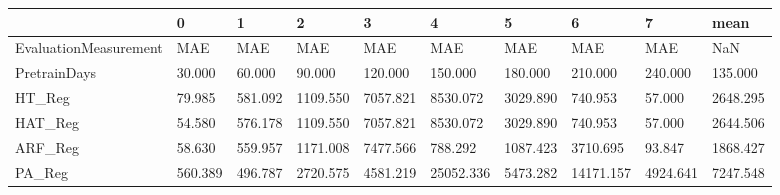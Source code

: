 \begin{tabular}{llllllllll}
\toprule
{} &       0 &       1 &        2 &        3 &         4 &        5 &         6 &        7 &     mean \\
\midrule
EvaluationMeasurement &     MAE &     MAE &      MAE &      MAE &       MAE &      MAE &       MAE &      MAE &      NaN \\
PretrainDays          &  30.000 &  60.000 &   90.000 &  120.000 &   150.000 &  180.000 &   210.000 &  240.000 &  135.000 \\
HT\_Reg                &  79.985 & 581.092 & 1109.550 & 7057.821 &  8530.072 & 3029.890 &   740.953 &   57.000 & 2648.295 \\
HAT\_Reg               &  54.580 & 576.178 & 1109.550 & 7057.821 &  8530.072 & 3029.890 &   740.953 &   57.000 & 2644.506 \\
ARF\_Reg               &  58.630 & 559.957 & 1171.008 & 7477.566 &   788.292 & 1087.423 &  3710.695 &   93.847 & 1868.427 \\
PA\_Reg                & 560.389 & 496.787 & 2720.575 & 4581.219 & 25052.336 & 5473.282 & 14171.157 & 4924.641 & 7247.548 \\
\bottomrule
\end{tabular}
